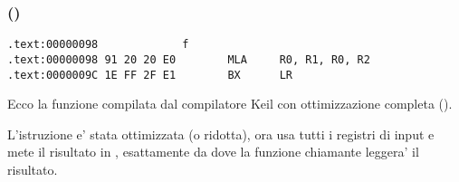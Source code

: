 \subsubsection{\OptimizingKeilVI (\ARMMode)}

\begin{lstlisting}[label=ARM_leaf_example1,style=customasmARM]
.text:00000098             f
.text:00000098 91 20 20 E0        MLA     R0, R1, R0, R2
.text:0000009C 1E FF 2F E1        BX      LR
\end{lstlisting}


Ecco la funzione \ttf compilata dal compilatore Keil con ottimizzazione completa (\Othree).

L'istruzione \MOV e' stata ottimizzata (o ridotta), ora  usa tutti i registri di input e mete il risultato in , esattamente da dove
la funzione chiamante leggera' il risultato.
